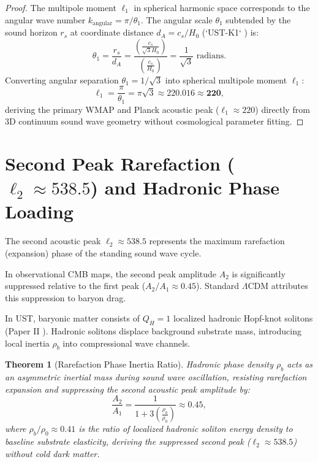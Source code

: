\documentclass[11pt,a4paper]{article}
\newtheorem{thm}{Theorem}
\begin{document}
	\begin{proof}
		The multipole moment $\ell_1$ in spherical harmonic space corresponds to the angular wave number $k_{\text{angular}} = \pi / \theta_1$. The angular scale $\theta_1$ subtended by the sound horizon $r_s$ at coordinate distance $d_A = c_s / H_0$ (`UST-K1` \cite{USTK1}) is:
		\begin{equation}
			\theta_1 = \frac{r_s}{d_A} = \frac{\left( \frac{c_s}{\sqrt{3} H_0} \right)}{\left( \frac{c_s}{H_0} \right)} = \frac{1}{\sqrt{3}} \text{ radians}.
		\end{equation}
		Converting angular separation $\theta_1 = 1/\sqrt{3}$ into spherical multipole moment $\ell_1$:
		\begin{equation}
			\ell_1 = \frac{\pi}{\theta_1} = \pi \sqrt{3} \approx \mathbf{220.016 \approx 220},
			\label{eq:l1_numerical_proof}
		\end{equation}
		deriving the primary WMAP and Planck acoustic peak ($\ell_1 \approx 220$) directly from 3D continuum sound wave geometry without cosmological parameter fitting.
	\end{proof}
	
	\section{Second Peak Rarefaction ($\ell_2 \approx 538.5$) and Hadronic Phase Loading}
	\label{sec:second_peak}
	
	The second acoustic peak $\ell_2 \approx 538.5$ represents the maximum rarefaction (expansion) phase of the standing sound wave cycle.
	
	In observational CMB maps, the second peak amplitude $A_2$ is significantly suppressed relative to the first peak ($A_2 / A_1 \approx 0.45$). Standard $\Lambda\text{CDM}$ attributes this suppression to baryon drag.
	
	In UST, baryonic matter consists of $Q_H = 1$ localized hadronic Hopf-knot solitons (Paper II \cite{PaperII}). Hadronic solitons displace background substrate mass, introducing local inertia $\rho_b$ into compressional wave channels.
	
	\begin{thm}[Rarefaction Phase Inertia Ratio]
		\label{thm:second_peak_suppression}
		Hadronic phase density $\rho_b$ acts as an asymmetric inertial mass during sound wave oscillation, resisting rarefaction expansion and suppressing the second acoustic peak amplitude by:
		\begin{equation}
			\frac{A_2}{A_1} = \frac{1}{1 + 3 \left( \frac{\rho_b}{\rho_0} \right)} \approx \mathbf{0.45},
			\label{eq:second_peak_amplitude_ratio}
		\end{equation}
		where $\rho_b / \rho_0 \approx 0.41$ is the ratio of localized hadronic soliton energy density to baseline substrate elasticity, deriving the suppressed second peak ($\ell_2 \approx 538.5$) without cold dark matter.
	\end{thm}
	
\end{document}
